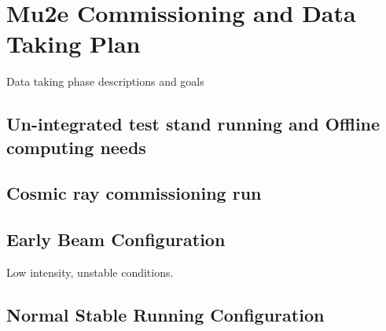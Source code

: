 \section{Mu2e Commissioning and Data Taking Plan}
\label{sec:runplan}
Data taking phase descriptions and goals
\subsection{Un-integrated test stand running and Offline computing needs}
\subsection{Cosmic ray commissioning run}

\subsection{Early Beam Configuration}
Low intensity, unstable conditions.



\subsection{ Normal Stable Running Configuration}

